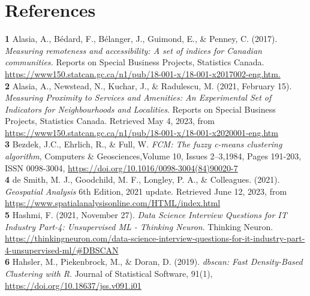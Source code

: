 \documentclass[11pt, a4paper]{article}
\begin{document}
\pagebreak
\section{References}




\noindent\textbf{1} Alasia, A., Bédard, F., Bélanger, J., Guimond, E., \& Penney, C. (2017). \textit{Measuring remoteness and accessibility: A set of indices for Canadian communities.} Reports on Special Business Projects, Statistics Canada. \sloppy\url{https://www150.statcan.gc.ca/n1/pub/18-001-x/18-001-x2017002-eng.htm.} \\

\noindent\textbf{2} Alasia, A., Newstead, N., Kuchar, J., \& Radulescu, M. (2021, February 15). \textit{Measuring Proximity to Services and Amenities: An Experimental Set of Indicators for Neighbourhoods and Localities}. Reports on Special Business Projects, Statistics Canada. Retrieved May 4, 2023, from \sloppy\url{https://www150.statcan.gc.ca/n1/pub/18-001-x/18-001-x2020001-eng.htm}  \\ 

\noindent\textbf{3} Bezdek, J.C., Ehrlich, R., \& Full, W. \textit{FCM: The fuzzy c-means clustering algorithm}, Computers \& Geosciences,Volume 10, Issues 2–3,1984, Pages 191-203, ISSN 0098-3004, \sloppy\url{https://doi.org/10.1016/0098-3004(84)90020-7} \\ %

\noindent\textbf{4} de Smith, M. J., Goodchild, M. F., Longley, P. A., \& Colleagues. (2021). \textit{Geospatial Analysis} 6th Edition, 2021 update. Retrieved June 12, 2023, from \sloppy\url{https://www.spatialanalysisonline.com/HTML/index.html
} \\

\noindent\textbf{5} Hashmi, F. (2021, November 27). \textit{Data Science Interview Questions for IT Industry Part-4: Unsupervised ML - Thinking 	Neuron}. Thinking Neuron. \sloppy\url{https://thinkingneuron.com/data-science-interview-questions-for-it-industry-part-4-unsupervised-ml/\#DBSCAN} \\

\noindent\textbf{6} Hahsler, M., Piekenbrock, M., \& Doran, D. (2019). \textit{dbscan: Fast Density-Based Clustering with R}. Journal of Statistical Software, 91(1), \sloppy\url{https://doi.org/10.18637/jss.v091.i01} \\
\end{document}
